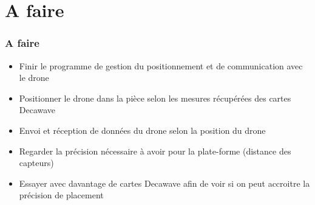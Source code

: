 \documentclass[12pt]{beamer}
\begin{document}
	\section{A faire}
	\begin{frame}
	\frametitle{A faire}
	    \begin{alertblock}{}
    	    \begin{itemize}
    	    [triangle]
    	        \item Finir le programme de gestion du positionnement et de communication avec le drone
    	        \item Positionner le drone dans la pièce selon les mesures récupérées des cartes Decawave
    	        \item Envoi et réception de données du drone selon la position du drone
    	        \item Regarder la précision nécessaire à avoir pour la plate-forme (distance des capteurs)
    	        \item Essayer avec davantage de cartes Decawave afin de voir si on peut accroitre la précision de placement
    	    \end{itemize}
	    \end{alertblock}
	\end{frame}

	
\end{document}
